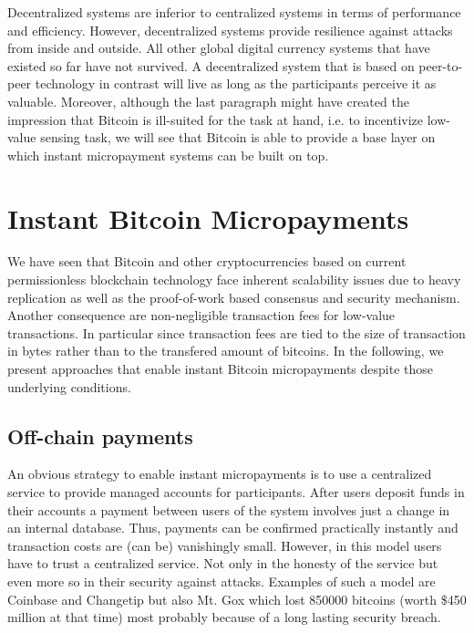 \documentclass[10pt,journal,compsoc]{IEEEtran}
\begin{document}
Decentralized systems are inferior to centralized systems in terms of performance and efficiency. However, decentralized systems provide resilience against attacks from inside and outside. All other global digital currency systems that have existed so far have not survived. A decentralized system that is based on peer-to-peer technology in contrast will live as long as the participants perceive it as valuable.
Moreover, although the last paragraph might have created the impression that Bitcoin is ill-suited for the task at hand, i.e. to incentivize low-value sensing task, we will see that Bitcoin is able to provide a base layer on which instant micropayment systems can be built on top.


\section{Instant Bitcoin Micropayments}

We have seen that Bitcoin and other cryptocurrencies based on current permissionless blockchain technology face inherent scalability issues due to heavy replication as well as the proof-of-work based consensus and security mechanism. Another consequence are non-negligible transaction fees for low-value transactions. In particular since transaction fees are tied to the size of transaction in bytes rather than to the transfered amount of bitcoins. In the following, we present approaches that enable instant Bitcoin micropayments despite those underlying conditions.

\subsection{Off-chain payments}

An obvious strategy to enable instant micropayments is to use a centralized service to provide managed accounts for participants. After users deposit funds in their accounts a payment between users of the system involves just a change in an internal database. Thus, payments can be confirmed practically instantly and transaction costs are (can be) vanishingly small. However, in this model users have to trust a centralized service. Not only in the honesty of the service but even more so in their security against attacks. Examples of such a model are Coinbase and Changetip but also Mt. Gox which lost 850000 bitcoins (worth \$450 million at that time) most probably because of a long lasting security breach.
\end{document}
